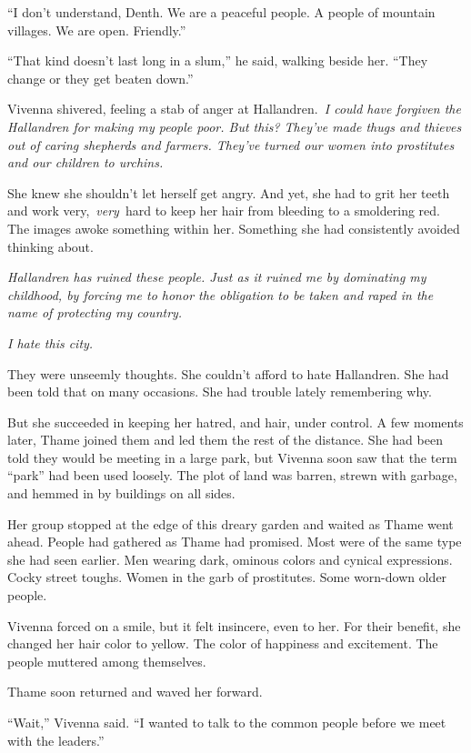 “I don’t understand, Denth. We are a peaceful people. A people of mountain villages. We are open. Friendly.”

“That kind doesn’t last long in a slum,” he said, walking beside her. “They change or they get beaten down.”

Vivenna shivered, feeling a stab of anger at Hallandren.~\textit{I could have forgiven the Hallandren for making my people poor. But this? They’ve made thugs and thieves out of caring shepherds and farmers. They’ve turned our women into prostitutes and our children to urchins.}

She knew she shouldn’t let herself get angry. And yet, she had to grit her teeth and work very,~\textit{very}~hard to keep her hair from bleeding to a smoldering red. The images awoke something within her. Something she had consistently avoided thinking about.

\textit{Hallandren has ruined these people. Just as it ruined me by dominating my childhood, by forcing me to honor the obligation to be taken and raped in the name of protecting my country.}

\textit{I hate this city.}

They were unseemly thoughts. She couldn’t afford to hate Hallandren. She had been told that on many occasions. She had trouble lately remembering why.

But she succeeded in keeping her hatred, and hair, under control. A few moments later, Thame joined them and led them the rest of the distance. She had been told they would be meeting in a large park, but Vivenna soon saw that the term “park” had been used loosely. The plot of land was barren, strewn with garbage, and hemmed in by buildings on all sides.

Her group stopped at the edge of this dreary garden and waited as Thame went ahead. People had gathered as Thame had promised. Most were of the same type she had seen earlier. Men wearing dark, ominous colors and cynical expressions. Cocky street toughs. Women in the garb of prostitutes. Some worn-down older people.

Vivenna forced on a smile, but it felt insincere, even to her. For their benefit, she changed her hair color to yellow. The color of happiness and excitement. The people muttered among themselves.

Thame soon returned and waved her forward.

“Wait,” Vivenna said. “I wanted to talk to the common people before we meet with the leaders.”

